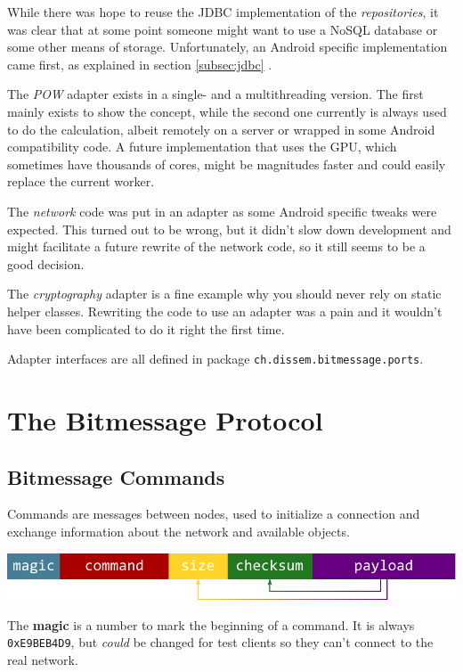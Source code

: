 \documentclass{bfh}
\begin{document}
  While there was hope to reuse the \acs{JDBC} implementation of the \textit{repositories}, it was clear that at some point someone might want to use a \acs{NoSQL} database or some other means of storage. Unfortunately, an Android specific implementation came first, as explained in section \ref{subsec:jdbc} .

  The \textit{\acl{POW}} adapter exists in a single- and a multithreading version. The first mainly exists to show the concept, while the second one currently is always used to do the calculation, albeit remotely on a server or wrapped in some Android compatibility code. A future implementation that uses the \acs{GPU}, which sometimes have thousands of cores, might be magnitudes faster and could easily replace the current worker.

  The \textit{network} code was put in an adapter as some Android specific tweaks were expected. This turned out to be wrong, but it didn't slow down development and might facilitate a future rewrite of the network code, so it still seems to be a good decision.

  The \textit{cryptography} adapter is a fine example why you should never rely on static helper classes. Rewriting the code to use an adapter was a pain and it wouldn't have been complicated to do it right the first time.

  Adapter interfaces are all defined in package \texttt{ch.dissem.bitmessage.ports}.


  \newpage
  \section{The Bitmessage Protocol}

  \subsection{Bitmessage Commands}

  Commands are messages between nodes, used to initialize a connection and exchange information about the network and available objects.

  \includegraphics[width=\textwidth]{images/command.pdf}

  The \textbf{magic} is a number to mark the beginning of a command. It is always \texttt{0xE9BEB4D9}, but \textit{could} be changed for test clients so they can't connect to the real network.
\end{document}
